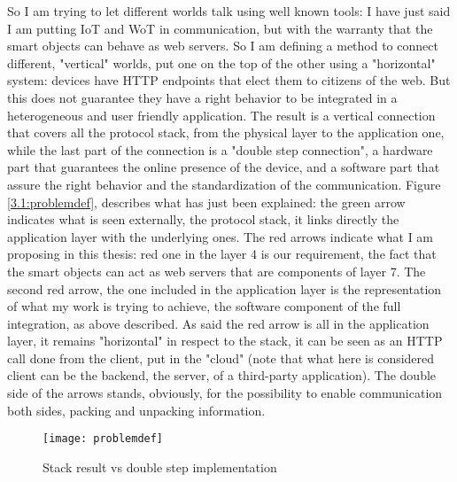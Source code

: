 So I am trying to let different worlds talk using  well known tools: I have just said I am putting IoT and WoT in communication, but with the warranty that the smart objects can behave as web servers. So I am defining a method to connect different, "vertical" worlds, put one on the top of the other using a "horizontal" system: devices have HTTP endpoints that elect them to citizens of the web. But this does not guarantee they have a right behavior to be integrated in a heterogeneous and user friendly application. The result is a vertical connection that covers all the protocol stack, from the physical layer to the application one, while the last part of the connection is a "double step connection", a hardware part that guarantees the online presence of the device, and a software part that assure the right behavior and the standardization of the communication. Figure \vref{3.1:problemdef}, describes what has just been explained: the green arrow indicates what is seen externally, the protocol stack, it links directly the application layer with the underlying ones. The red arrows indicate what I am proposing in this thesis: red one in the layer 4 is our requirement, the fact that the smart objects can act as web servers that are components of layer 7. The second red arrow, the one included in the application layer is the representation of what my work is trying to achieve, the software component of the full integration, as above described. As said the red arrow is all in the application layer, it remains "horizontal" in respect to the stack, it can be seen as an HTTP call done from the client, put in the "cloud" (note that what here is considered client can be the backend, the server, of a third-party application). The double side of the arrows stands, obviously, for the possibility to enable communication both sides, packing and unpacking information.

\begin{figure}[h]
	\centering
	\texttt{[image: problemdef]}
	\caption{Stack result vs double step implementation}
	\label{3.1:problemdef}
\end{figure}

